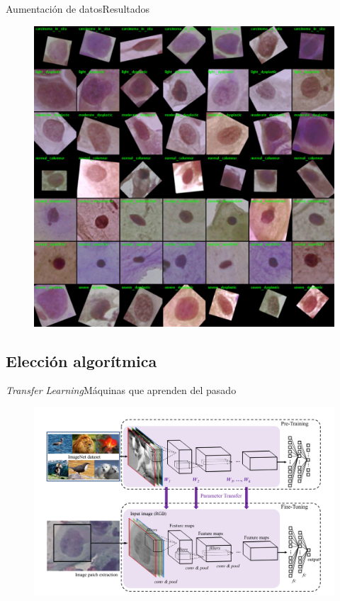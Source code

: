 \documentclass{beamer}
\begin{document}
    \begin{frame}{Aumentación de datos}{Resultados}
        \begin{figure}[]
            \centering
            \includegraphics[height=0.9\textheight]{muestras_augment}
        \end{figure}
    \end{frame}

    \subsection{Elección algorítmica}
    \begin{frame}{\emph{Transfer Learning}}{Máquinas que aprenden del pasado}
        \begin{figure}[]
            \centering
            \includegraphics[width=1\textwidth]{transfer}
        \end{figure}
    \end{frame}
\end{document}
